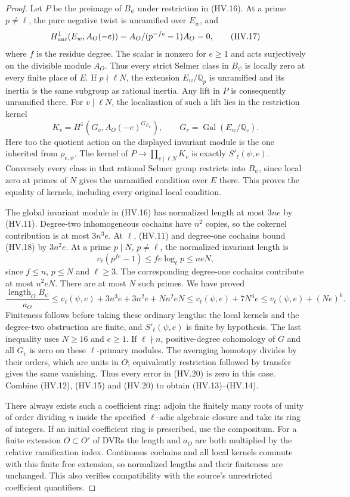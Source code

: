 \begin{proof}
Let $P$ be the preimage of $B_\psi$ under restriction in
(HV.16).  At a prime $p\ne\ell$, the pure negative twist is
unramified over $E_w$, and
\[
 H^1_{\rm unr}(E_w,A_O(-e))
       =A_O/(p^{-fe}-1)A_O=0,
 \tag{HV.17}
\]
where $f$ is the residue degree.  The scalar is nonzero for
$e\ge1$ and acts surjectively on the divisible module $A_O$.
Thus every strict Selmer class in $B_\psi$ is locally zero
at every finite place of $E$.
If $p\nmid\ell N$, the extension $E_w/\mathbb Q_p$ is
unramified and its inertia is the same subgroup as rational
inertia.  Any lift in $P$ is consequently unramified there.
For $v\mid\ell N$, the localization of such a lift lies in
the restriction kernel
\[
 K_v=H^1(G_v,A_O(-e)^{G_{E_w}}),
       \qquad G_v=\operatorname{Gal}(E_w/\mathbb Q_v).
 \tag{HV.18}
\]
Here too the quotient action on the displayed invariant
module is the one inherited from $\rho_{e,\psi}$.
The kernel of $P\to\prod_{v\mid\ell N}K_v$ is exactly
$S'_\ell(\psi,e)$.  Conversely every class in that rational
Selmer group restricts into $B_\psi$, since local zero at
primes of $N$ gives the unramified condition over $E$ there.
This proves the equality of kernels, including every original
local condition.

The global invariant module in (HV.16) has normalized length
at most $3ne$ by (HV.11).  Degree-two inhomogeneous cochains
have $n^2$ copies, so the cokernel contribution is at most
$3n^3e$.  At $\ell$, (HV.11) and degree-one cochains bound
(HV.18) by $3n^2e$.  At a prime $p\mid N$, $p\ne\ell$,
the normalized invariant length is
\[
 v_\ell(p^{fe}-1)\le fe\log_\ell p\le neN,
 \tag{HV.19}
\]
since $f\le n$, $p\le N$ and $\ell\ge3$.
The corresponding degree-one cochains contribute at most
$n^2eN$.  There are at most $N$ such primes.  We have proved
\[
 \frac{\operatorname{length}_O B_\psi}{a_O}
 \le v_\ell(\psi,e)+3n^3e+3n^2e+Nn^2eN
 \le v_\ell(\psi,e)+7N^4e
 \le v_\ell(\psi,e)+(Ne)^6.
 \tag{HV.20}
\]
Finiteness follows before taking these ordinary lengths: the
local kernels and the degree-two obstruction are finite, and
$S'_\ell(\psi,e)$ is finite by hypothesis.  The last inequality
uses $N\ge16$ and $e\ge1$.
If $\ell\nmid n$, positive-degree cohomology of $G$ and all
$G_v$ is zero on these $\ell$-primary modules.  The averaging
homotopy divides by their orders, which are units in $O$;
equivalently restriction followed by transfer gives the same
vanishing.  Thus every error in (HV.20) is zero in this case.
Combine (HV.12), (HV.15) and (HV.20) to obtain (HV.13)--(HV.14).

There always exists such a coefficient ring: adjoin the finitely
many roots of unity of order dividing $n$ inside the specified
$\ell$-adic algebraic closure and take its ring of integers.
If an initial coefficient ring is prescribed, use the compositum.
For a finite extension $O\subset O'$ of DVRs the length and
$a_O$ are both multiplied by the relative ramification index.
Continuous cochains and all local kernels commute with this
finite free extension, so normalized lengths and their
finiteness are unchanged.  This also verifies compatibility
with the source's unrestricted coefficient quantifiers.
\end{proof}

